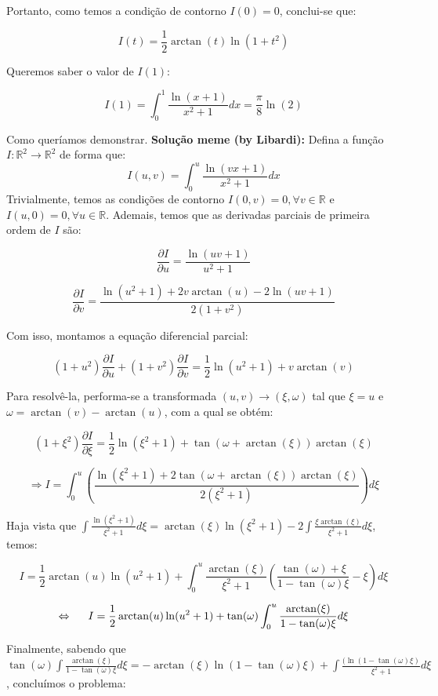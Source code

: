 Portanto, como temos a condição de contorno $I(0) = 0$, conclui-se que:

$$I(t) = \frac{1}{2}\arctan(t)\ln(1+t^2)$$

Queremos saber o valor de $I(1)$:

$$I(1) = \int_0^1\frac{\ln(x+1)}{x^2+1}dx = \frac{\pi}{8}\ln(2)$$

Como queríamos demonstrar.
\newline \newline
\textbf{Solução meme (by Libardi):}
\newline
Defina a função $I:\mathbb{R}^2\rightarrow\mathbb{R}^2$ de forma que:
$$I(u,v) = \int_0^u\frac{\ln(vx+1)}{x^2+1}dx$$
Trivialmente, temos as condições de contorno $I(0,v) = 0, \forall v\in\mathbb{R}$ e $I(u,0) = 0, \forall u\in\mathbb{R}$. Ademais, temos que as derivadas parciais de primeira ordem de $I$ são:

$$\frac{\partial I}{\partial u} = \frac{\ln(uv+1)}{u^2+1}$$

$$\frac{\partial I}{\partial v} = \frac{\ln(u^2+1)+2v\arctan(u)-2\ln(uv+1)}{2(1+v^2)}$$

Com isso, montamos a equação diferencial parcial:

$$(1+u^2)\frac{\partial I}{\partial u}+(1+v^2)\frac{\partial I}{\partial v} = \frac{1}{2}\ln(u^2+1)+v\arctan(v)$$

Para resolvê-la, performa-se a transformada $(u,v)\rightarrow(\xi,\omega)$ tal que $\xi = u$ e $\omega = \arctan(v)-\arctan(u)$, com a qual se obtém:

$$(1+\xi^2)\frac{\partial I}{\partial \xi} = \frac{1}{2}\ln(\xi^2+1)+\tan(\omega+\arctan(\xi))\arctan(\xi)$$

$$\Rightarrow I = \int_0^u\left(\frac{\ln(\xi^2+1)+2\tan(\omega+\arctan(\xi))\arctan(\xi)}{2(\xi^2+1)}\right) d\xi$$

Haja vista que $\int\frac{\ln(\xi^2+1)}{\xi^2+1}d\xi = \arctan(\xi)\ln(\xi^2+1)-2\int\frac{\xi\arctan(\xi)}{\xi^2+1}d\xi$, temos:

$$I = \frac{1}{2}\arctan(u)\ln(u^2+1)+\int_0^u\frac{\arctan(\xi)}{\xi^2+1}\left(\frac{\tan(\omega)+\xi}{1-\tan(\omega)\xi} - \xi\right)d\xi$$

$$\Leftrightarrow\hspace{0.5cm} I=\frac{1}{2}\arctan(u)\ln(u^2+1)+\tan(\omega)\int_0^u\frac{\arctan(\xi)}{1-\tan(\omega)\xi}d\xi$$

Finalmente, sabendo que $\tan(\omega)\int\frac{\arctan(\xi)}{1-\tan(\omega)\xi}d\xi=-\arctan(\xi)\ln(1-\tan(\omega)\xi)+\int\frac{(\ln(1-\tan(\omega)\xi)}{\xi^2+1}d\xi$, concluímos o problema:

